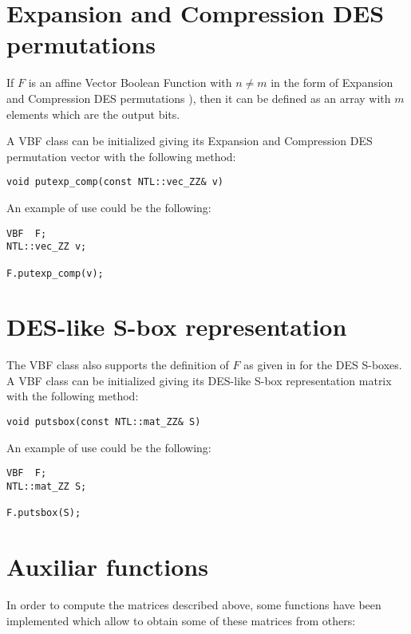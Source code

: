 \section{Expansion and Compression DES permutations}

If $F$ is an affine Vector Boolean Function with $n \neq m$ in the form of Expansion and Compression DES permutations \cite{DES:77}), then it can be defined as an array with $m$ elements which are the output bits.

A VBF class can be initialized giving its Expansion and Compression DES permutation vector with the following method:

\begin{verbatim}
void putexp_comp(const NTL::vec_ZZ& v)
\end{verbatim}

An example of use could be the following:

\begin{verbatim}
VBF  F;
NTL::vec_ZZ v;

F.putexp_comp(v);
\end{verbatim}

\section{DES-like S-box representation}

The VBF class also supports the definition of $F$ as given in \cite{DES:77} for the DES S-boxes.  A VBF class can be initialized giving its DES-like S-box representation matrix with the following method:

\begin{verbatim}
void putsbox(const NTL::mat_ZZ& S)
\end{verbatim}

An example of use could be the following:

\begin{verbatim}
VBF  F;
NTL::mat_ZZ S;

F.putsbox(S);
\end{verbatim}

\section{Auxiliar functions}

In order to compute the matrices described above, some functions have been
implemented which allow to obtain some of these matrices from others: 

